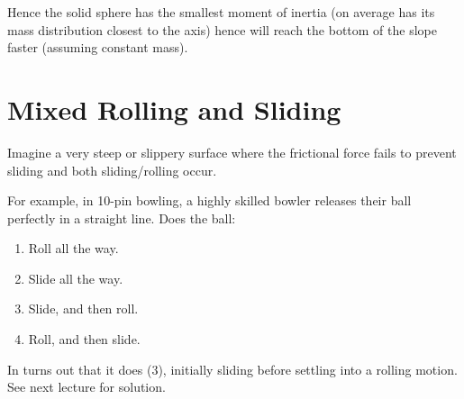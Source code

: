Hence the solid sphere has the smallest moment of inertia (on average has its mass distribution closest to the axis) hence will reach the bottom of the slope faster (assuming constant mass).

\section{Mixed Rolling and Sliding}
Imagine a very steep or slippery surface where the frictional force fails to prevent sliding and both sliding/rolling occur.

For example, in 10-pin bowling, a highly skilled bowler releases their ball perfectly in a straight line. Does the ball:
\begin{enumerate}
    \item Roll all the way.
    \item Slide all the way.
    \item Slide, and then roll.
    \item Roll, and then slide.
\end{enumerate}

In turns out that it does (3), initially sliding before settling into a rolling motion. See next lecture for solution.


